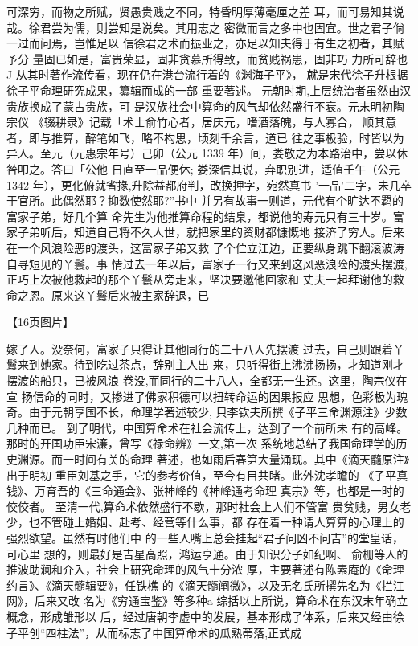 可深穷，而物之所赋，贤愚贵贱之不同，特昏明厚薄毫厘之差
耳，而可易知其说哉。徐君尝为儒，则尝知是说矣。其用志之
密微而言之多中也固宜。世之君子倘一过而问焉，岂惟足以
信徐君之术而振业之，亦足以知夫得于有生之初者，其赋予分
量固已如是，富贵荣显，固非贪慕所得致，而贫贱祸患，固非巧
力所可辞也J
从其时著作流传看，现在仍在港台流行着的《渊海子平》，
就是宋代徐子升根据徐子平命理研究成果，纂辑而成的一部
重要著述。
元朝时期,上层统治者虽然由汉贵族换成了蒙古贵族，可
是汉族社会中算命的风气却依然盛行不衰。元末明初陶宗仪
《辍耕录》记载「术士俞竹心者，居庆元，嗜酒落魄，与人寡合，
顺其意者，即与推算，醉笔如飞，略不构思，顷刻千余言，道已
往之事极验，时皆以为异人。至元（元惠宗年号）己卯（公元
1339 年）间，娄敬之为本路治中，尝以休咎叩之。答曰「公他
日直至一品便休; 娄深信其说，弃职别进，适值壬午（公元
1342 年），更化俯就省掾,升除益都府判，改换押字，宛然真书
'一品'二字，未几卒于官所。此偶然耶？抑数使然耶?”书中
并另有故事一则道，元代有个旷达不羁的富家子弟，好几个算
命先生为他推算命程的结臬，都说他的寿元只有三十岁。富
家子弟听后，知道自己将不久人世，就把家里的资财都慷慨地
接济了穷人。后来在一个风浪险恶的渡头，这富家子弟又救
了个伫立江边，正要纵身跳下翻滚波涛自寻短见的丫鬟。事
情过去一年以后，富家子一行又来到这风恶浪险的渡头摆渡,
正巧上次被他救起的那个丫鬟从旁走来，坚决要邀他回家和
丈夫一起拜谢他的救命之恩。原来这丫鬟后来被主家辞退，已

【16页图片】

嫁了人。没奈何，富家子只得让其他同行的二十八人先摆渡
过去，自己则跟着丫鬟来到她家。待到吃过茶点，辞别主人出
来，只听得街上沸沸扬扬，才知道刚才摆渡的船只，已被风浪
卷没,而同行的二十八人，全都无一生还。这里，陶宗仪在宣
扬信命的同时，又掺进了佛家积德可以扭转命运的因果报应
思想，色彩极为瑰奇。由于元朝享国不长，命理学著述较少,
只李钦夫所撰《子平三命渊源注》少数几种而已。
到了明代，中国算命术在社会流传上，达到了一个前所未
有的高峰。那时的开国功臣宋濂，曾写《禄命辨》一文,第一次
系统地总结了我国命理学的历史渊源。而一时间有关的命理
著述，也如雨后春笋大量涌现。其中《滴天髓原注》出于明初
重臣刘基之手，它的参考价值，至今有目共睹。此外沈孝瞻的
《子平真钱》、万育吾的《三命通会》、张神峰的《神峰通考命理
真宗》等，也都是一时的佼佼者。
至清一代,算命术依然盛行不歇，那时社会上人们不管富
贵贫贱，男女老少，也不管碰上婚姻、赴考、经营等什么事，都
存在着一种请人算算的心理上的强烈欲望。虽然有时他们中
的一些人嘴上总会挂起“君子问凶不问吉”的堂皇话，可心里
想的，则最好是吉星高照，鸿运亨通。由于知识分子如纪啊、
俞栅等人的推波助澜和介入，社会上研究命理的风气十分浓
厚，主要著述有陈素庵的《命理约言》、《滴天髓辑要》，任铁樵
的《滴天髓阐微》，以及无名氏所撰先名为《拦江网》，后来又改
名为《穷通宝鉴》等多种a
综括以上所说，算命术在东汉末年确立概念，形成雏形以
后，经过唐朝李虚中的发展，基本形成了体系，后来又经由徐
子平创“四柱法”，从而标志了中国算命术的瓜熟蒂落,正式成

